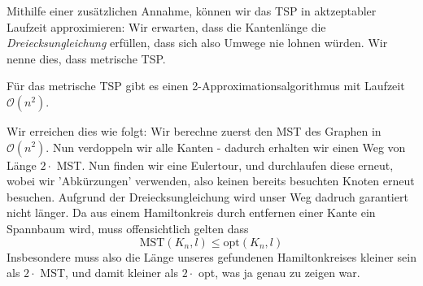 Mithilfe einer zusätzlichen Annahme, können wir das TSP in aktzeptabler Laufzeit approximieren: Wir erwarten,
dass die Kantenlänge die \textit{Dreiecksungleichung} erfüllen, dass sich also Umwege nie lohnen würden. Wir
nenne dies, dass metrische TSP.

\begin{satz}[Satz]
    Für das metrische TSP gibt es einen 2-Approximationsalgorithmus mit Laufzeit $\mathcal{O}(n^2)$.
\end{satz}
\bigskip

Wir erreichen dies wie folgt: Wir berechne zuerst den MST des Graphen in $\mathcal{O}(n^2)$. Nun verdoppeln wir
alle Kanten - dadurch erhalten wir einen Weg von Länge $2 \cdot$ MST. Nun finden wir eine Eulertour, und durchlaufen
diese erneut, wobei wir 'Abkürzungen' verwenden, also keinen bereits besuchten Knoten erneut besuchen. Aufgrund der
Dreiecksungleichung wird unser Weg dadruch garantiert nicht länger. Da aus einem Hamiltonkreis durch entfernen einer
Kante ein Spannbaum wird, muss offensichtlich gelten dass
$$\text{MST}(K_n,l) \leq \text{opt}(K_n,l)$$
Insbesondere muss also die Länge unseres gefundenen Hamiltonkreises kleiner sein als $2 \cdot$ MST, und damit kleiner
als $2 \cdot$ opt, was ja genau zu zeigen war.